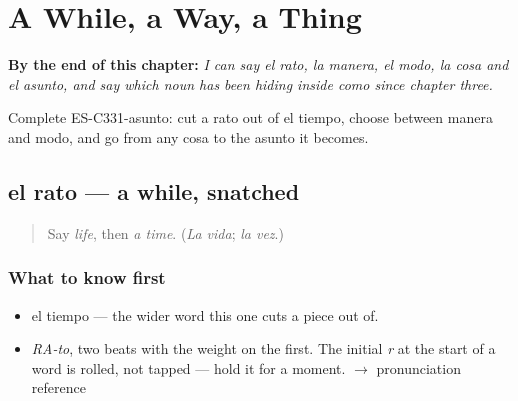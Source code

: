 
\chapter{A While, a Way, a Thing}
\label{ch:manera-y-asunto}

\begin{chapteropening}
\textbf{By the end of this chapter:} \emph{I can say el rato, la manera, el modo, la cosa and el asunto, and say which noun has been hiding inside como since chapter three.}

Complete ES-C331-asunto: cut a rato out of el tiempo, choose between manera and modo, and go from any cosa to the asunto it becomes.
\end{chapteropening}

\section[el rato]{el rato — a while, snatched}

\label{lesson:ES-C331-rato}



\begin{quote}
Say \emph{life}, then \emph{a time}. (\emph{La vida}; \emph{la vez}.)
\end{quote}

\subsection*{What to know first}
\begin{itemize}
\raggedright
  \item el tiempo — the wider word this one cuts a piece out of.
\end{itemize}

\begin{sounds}
\begin{itemize}
\raggedright
  \item \emph{RA-to}, two beats with the weight on the first. The initial \emph{r} at the start of a word is rolled, not tapped — hold it for a moment. $\to$ pronunciation reference
\end{itemize}
\end{sounds}

